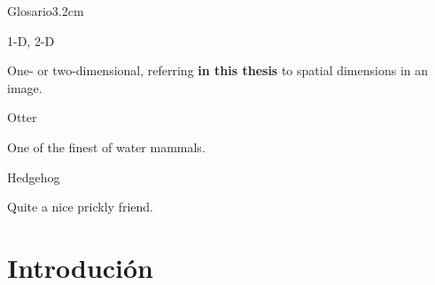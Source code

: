 \documentclass[a4paper, twoside]{templates/ociamthesis}
\begin{document}
\begin{romanpages}
  \dominitoc %

\flushbottom

\tableofcontents

\listoffigures
	\mtcaddchapter

\listoftables
  \mtcaddchapter
\begin{mclistof}{Glosario}{3.2cm}

\item[1-D, 2-D]

One- or two-dimensional, referring \textbf{in this thesis} to spatial dimensions in an image.

\item[Otter]

One of the finest of water mammals.

\item[Hedgehog]

Quite a nice prickly friend.

\end{mclistof} 


\end{romanpages}

\flushbottom

\hypertarget{introduciuxf3n}{%
\chapter*{Introdución}\label{introduciuxf3n}}
\end{document}
